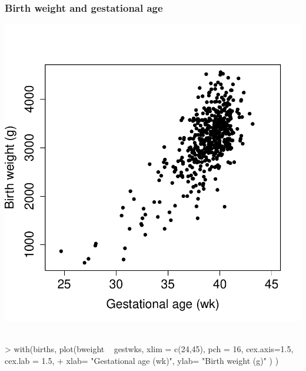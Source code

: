 \documentclass[12pt,dvipsnames,t,handout%
,aspectratio=169%
]{beamer}
\begin{document}
\begin{frame}[fragile]

\frametitle{Birth weight and gestational age}
\includegraphics[height=0.75\textheight,keepaspectratio]{lm-bw-by-gw}
\ \\[-2em]
{\small
\begin{Schunk}
\begin{Sinput}
> with(births, plot(bweight ~ gestwks, xlim = c(24,45), pch = 16, cex.axis=1.5, cex.lab = 1.5, 
+  xlab= "Gestational age (wk)", ylab= "Birth weight (g)" ) )
\end{Sinput}
\end{Schunk}
}			

\end{frame}
\end{document}
